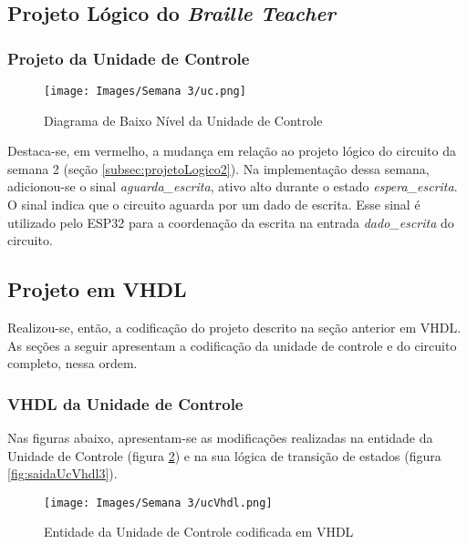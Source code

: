 \documentclass[amsmath,amssymb,floatfix]{report}
\begin{document}
\subsection{Projeto Lógico do \textit{Braille Teacher}}
\label{subsec:projetoLogico3}

\subsubsection{Projeto da Unidade de Controle}
\label{subsubsec:uc3}

\begin{figure}[H]
    \centering
    \texttt{[image: Images/Semana 3/uc.png]}
    \caption{Diagrama de Baixo Nível da Unidade de Controle}
    \label{fig:uc3}
\end{figure}

Destaca-se, em vermelho, a mudança em relação ao projeto lógico do circuito da semana 2 (seção \ref{subsec:projetoLogico2}). Na implementação dessa semana, adicionou-se o sinal \textit{aguarda\_escrita}, ativo alto durante o estado \textit{espera\_escrita}. O sinal indica que o circuito aguarda por um dado de escrita. Esse sinal é utilizado pelo ESP32 para a coordenação da escrita na entrada \textit{dado\_escrita} do circuito.

\subsection{Projeto em VHDL}
\label{subsec:projetoVhdl3}

Realizou-se, então, a codificação do projeto descrito na seção anterior em VHDL. As seções a seguir apresentam a codificação da unidade de controle e do circuito completo, nessa ordem.

\subsubsection{VHDL da Unidade de Controle}
\label{subsubsec:ucVhdl3}

Nas figuras abaixo, apresentam-se as modificações realizadas na entidade da Unidade de Controle (figura \ref{fig:ucVhdl3}) e na sua lógica de transição de estados (figura \ref{fig:saidaUcVhdl3}).

\begin{figure}[H]
    \centering
    \texttt{[image: Images/Semana 3/ucVhdl.png]}
    \caption{Entidade da Unidade de Controle codificada em VHDL}
    \label{fig:ucVhdl3}
\end{figure}
\end{document}
